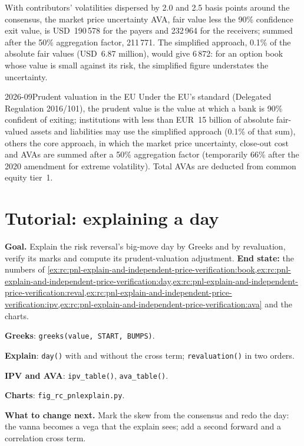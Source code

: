 \begin{example}\label{ex:rc:pnl-explain-and-independent-price-verification:ava}
With contributors' volatilities dispersed by 2.0 and 2.5 basis points around the consensus, the market
price uncertainty AVA, fair value less the 90\% confidence exit value, is USD~190\,578 for the payers and
232\,964 for the receivers; summed after the 50\% aggregation factor, 211\,771. The simplified approach,
0.1\% of the absolute fair values (USD~6.87 million), would give 6\,872: for an option book whose value is
small against its risk, the simplified figure understates the uncertainty.
\end{example}

\begin{dated}{2026-09}{Prudent valuation in the EU}\label{dat:rc:pnl-explain-and-independent-price-verification:pv}
Under the EU's  standard (Delegated Regulation 2016/101), the prudent value is the value
at which a bank is 90\% confident of exiting; institutions with less than EUR~15 billion of absolute fair-valued
assets and liabilities may use the simplified approach (0.1\% of that sum), others the core approach, in
which the market price uncertainty, close-out cost and  AVAs are summed after a 50\% aggregation
factor (temporarily 66\% after the 2020 amendment for extreme volatility). Total AVAs are deducted from
common equity tier~1.
\end{dated}

\section{Tutorial: explaining a day}\label{tut:rc:pnl-explain-and-independent-price-verification:tutorial}

\begin{tutorial}
\textbf{Goal.} Explain the risk reversal's big-move day by Greeks and by revaluation, verify its marks and
compute its prudent-valuation adjustment. \textbf{End state:} the numbers of
\cref{ex:rc:pnl-explain-and-independent-price-verification:book,ex:rc:pnl-explain-and-independent-price-verification:day,ex:rc:pnl-explain-and-independent-price-verification:reval,ex:rc:pnl-explain-and-independent-price-verification:ipv,ex:rc:pnl-explain-and-independent-price-verification:ava}
and the charts.
\begin{tutsteps}
\item \textbf{Greeks}: \texttt{greeks(value, START, BUMPS)}.
\item \textbf{Explain}: \texttt{day()} with and without the cross term; \texttt{revaluation()} in two orders.
\item \textbf{IPV and AVA}: \texttt{ipv\_table()}, \texttt{ava\_table()}.
\item \textbf{Charts}: \texttt{fig\_rc\_pnlexplain.py}.
\end{tutsteps}
\textbf{What to change next.} Mark the skew from the consensus and redo the day: the vanna becomes a vega
that the explain sees; add a second forward and a correlation cross term.
\end{tutorial}

